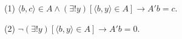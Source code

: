 (1) $\langle b, c \rangle \in A \wedge (\exists! y)[\langle b, y \rangle \in A] \rightarrow A'b = c$.

(2) $\neg(\exists! y)[\langle b, y \rangle \in A] \rightarrow A'b = 0$.
